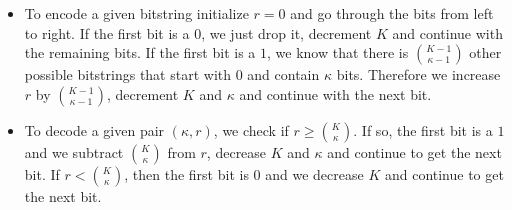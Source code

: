 \begin{itemize}
  \item To encode a given bitstring initialize $r = 0$ and go through the bits from left to right. If the first bit is a $0$, we just drop it, decrement $K$ and continue with the remaining bits. If the first bit is a $1$, we know that there is $\binom{K-1}{\kappa-1}$ other possible bitstrings that start with $0$ and contain $\kappa$ bits. Therefore we increase $r$ by $\binom{K-1}{\kappa-1}$, decrement $K$ and $\kappa$ and continue with the next bit.
  \item To decode a given pair $(\kappa, r)$, we check if $r \geq \binom{K}{\kappa}$. If so, the first bit is a $1$ and we subtract $\binom{K}{\kappa}$ from $r$, decrease $K$ and $\kappa$ and continue to get the next bit. If $r < \binom{K}{\kappa}$, then the first bit is $0$ and we decrease $K$ and continue to get the next bit.
\end{itemize}
